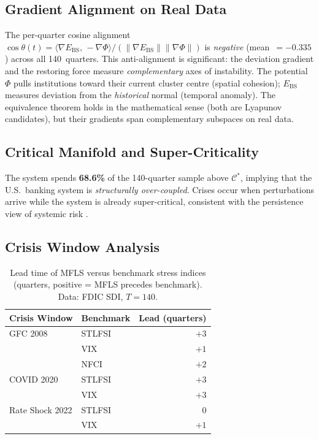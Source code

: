 \documentclass[final]{siamltex}
\newcommand{\norm}[1]{\lVert #1 \rVert}
\newcommand{\inner}[2]{\langle #1,\, #2 \rangle}
\providecommand{\grad}{\nabla}
\newcommand{\Ebs}{E_{\mathrm{BS}}}
\newcommand{\Cman}{\mathcal{C}^*}
\newcommand{\costheta}{\cos\theta}
\begin{document}
\subsection{Gradient Alignment on Real Data}

The per-quarter cosine alignment $\costheta(t)=
\inner{\grad\Ebs}{-\grad\Phi}/
(\norm{\grad\Ebs}\norm{\grad\Phi})$ is \emph{negative}
(mean~$=-0.335$) across all 140~quarters. This anti-alignment is
significant: the deviation gradient and the restoring force measure
\emph{complementary} axes of instability. The potential $\Phi$ pulls
institutions toward their current cluster centre (spatial cohesion);
$\Ebs$ measures deviation from the \emph{historical} normal
(temporal anomaly). The equivalence theorem holds in the
mathematical sense (both are Lyapunov candidates), but their
gradients span complementary subspaces on real data.

\subsection{Critical Manifold and Super-Criticality}

The system spends \textbf{68.6\%} of the 140-quarter sample above
$\Cman$, implying that the U.S.\ banking system is \emph{structurally
over-coupled}. Crises occur when perturbations arrive while the
system is already super-critical, consistent with the persistence
view of systemic risk \cite{brunnermeier2009deciphering}.

\subsection{Crisis Window Analysis}

\begin{table}[htbp]
\centering
\caption{Lead time of MFLS versus benchmark stress indices
(quarters, positive = MFLS precedes benchmark). Data: FDIC SDI,
$T=140$.}
\label{tab:lead}
\begin{tabular}{llr}
\toprule
Crisis Window & Benchmark & Lead (quarters)\\
\midrule
GFC 2008    & STLFSI      & $+3$\\
            & VIX         & $+1$\\
            & NFCI        & $+2$\\
COVID 2020  & STLFSI      & $+3$\\
            & VIX         & $+3$\\
Rate Shock 2022 & STLFSI  & $0$\\
            & VIX         & $+1$\\
\bottomrule
\end{tabular}
\end{table}
\end{document}
